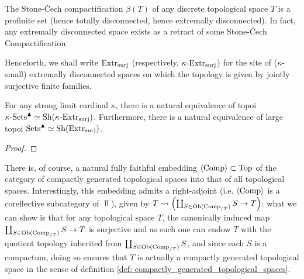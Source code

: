             \begin{example} \label{example: stone_cech_compactifications_of_discrete_spaces}
                The Stone-\v{C}ech compactification $\beta(T)$ of any discrete topological space $T$ is a profinite set (hence totally disconnected, hence extremally disconnected). In fact, any extremally disconnected space exists as a retract of some Stone-\v{C}ech Compactification.
            \end{example}
            \begin{convention} \label{conv: the_site_of_extremally_disconnected_spaces}
                Henceforth, we shall write $\mathrm{Extr}_{\mathrm{surj}}$ (respectively, $\kappa\text{-}\mathrm{Extr}_{\mathrm{surj}}$) for the site of ($\kappa$-small) extremally disconnected spaces on which the topology is given by jointly surjective finite families.
            \end{convention}
            \begin{proposition} \label{prop: condensed_sets_are_sheaves_on_extremally_disconnected_spaces}
                For any strong limit cardinal $\kappa$, there is a natural equivalence of topoi $\kappa\text{-}\mathrm{Sets}^{\blacktriangle} \simeq \mathrm{Sh}(\kappa\text{-}\mathrm{Extr}_{\mathrm{surj}})$. Furthermore, there is a natural equivalence of large topoi $\mathrm{Sets}^{\blacktriangle} \simeq \mathrm{Sh}(\mathrm{Extr}_{\mathrm{surj}})$.
            \end{proposition}
                \begin{proof}
                    
                \end{proof}
            \begin{remark}
                There is, of course, a natural fully faithful embedding $\langle\mathrm{Comp}\rangle \subset \mathrm{Top}$ of the category of compactly generated topological spaces into that of all topological spaces. Interestingly, this embedding admits a right-adjoint (i.e. $\langle\mathrm{Comp}\rangle$ is a coreflective subcategory of $\Top$), given by $T \leadsto \left(\coprod_{S \in \mathrm{Ob}(\mathrm{Comp}_{/T})} S \to T\right)$: what we can show is that for any topological space $T$, the canonically induced map $\coprod_{S \in \mathrm{Ob}(\mathrm{Comp}_{/T})} S \to T$ is surjective and as such one can endow $T$ with the quotient topology inherited from $\coprod_{S \in \mathrm{Ob}(\mathrm{Comp}_{/T})} S$, and since each $S$ is a compactum, doing so ensures that $T$ is actually a compactly generated topological space in the sense of definition \ref{def: compactly_generated_topological_spaces}. 
            \end{remark}
